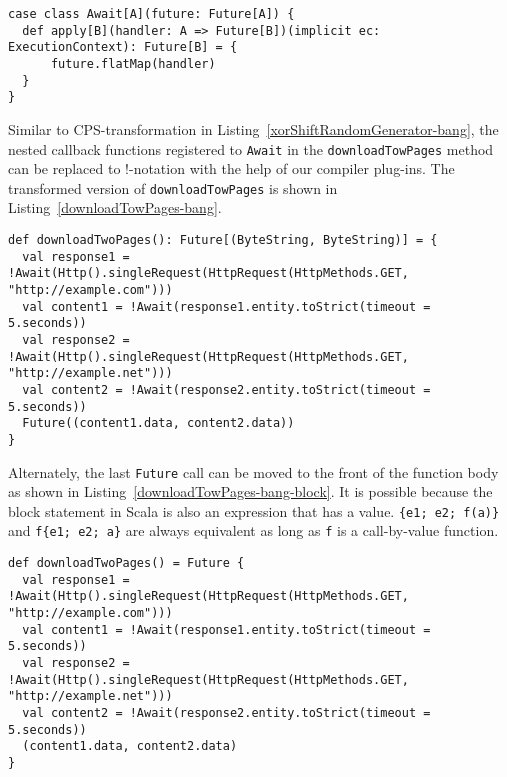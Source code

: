 \begin{lstlisting}[caption={Implementing \lstinline{Await} LDK as a forwarder to \lstinline{flatMap}},label={NonadaptiveAwait}]
case class Await[A](future: Future[A]) {
  def apply[B](handler: A => Future[B])(implicit ec: ExecutionContext): Future[B] = {
      future.flatMap(handler)
  }
}
\end{lstlisting}

Similar to CPS-transformation in Listing~\ref{xorShiftRandomGenerator-bang}, the nested callback functions registered to \lstinline{Await} in the \lstinline{downloadTowPages} method can be replaced to !-notation with the help of our compiler plug-ins. The transformed version of \lstinline{downloadTowPages} is shown in Listing~\ref{downloadTowPages-bang}.

\begin{lstlisting}[caption={Asynchronously downloading two web pages, in the style of !-notation},label={downloadTowPages-bang}]
def downloadTwoPages(): Future[(ByteString, ByteString)] = {
  val response1 = !Await(Http().singleRequest(HttpRequest(HttpMethods.GET, "http://example.com"))) 
  val content1 = !Await(response1.entity.toStrict(timeout = 5.seconds))
  val response2 = !Await(Http().singleRequest(HttpRequest(HttpMethods.GET, "http://example.net")))
  val content2 = !Await(response2.entity.toStrict(timeout = 5.seconds))
  Future((content1.data, content2.data))
}
\end{lstlisting}

Alternately, the last \lstinline{Future} call can be moved to the front of the function body as shown in Listing~\ref{downloadTowPages-bang-block}. It is possible because the block statement in Scala is also an expression that has a value. \lstinline|{e1; e2; f(a)}| and \lstinline|f{e1; e2; a}| are always equivalent as long as \lstinline{f} is a call-by-value function.

\begin{lstlisting}[caption={Asynchronously downloading two web pages, within a \lstinline{Future} block},label={downloadTowPages-bang-block}]
def downloadTwoPages() = Future {
  val response1 = !Await(Http().singleRequest(HttpRequest(HttpMethods.GET, "http://example.com"))) 
  val content1 = !Await(response1.entity.toStrict(timeout = 5.seconds))
  val response2 = !Await(Http().singleRequest(HttpRequest(HttpMethods.GET, "http://example.net")))
  val content2 = !Await(response2.entity.toStrict(timeout = 5.seconds))
  (content1.data, content2.data)
}
\end{lstlisting}

